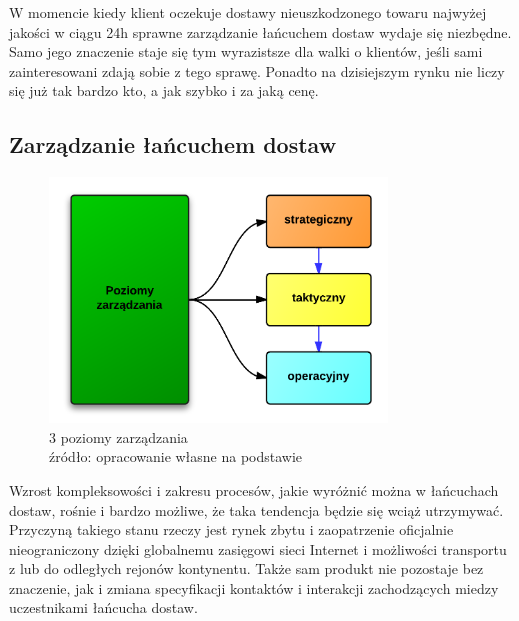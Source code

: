 		W momencie kiedy klient oczekuje dostawy nieuszkodzonego 
		towaru najwyżej jakości w ciągu 24h sprawne zarządzanie 
		łańcuchem dostaw wydaje się niezbędne. Samo jego znaczenie staje
		się tym wyrazistsze dla walki o klientów, jeśli sami zainteresowani
		zdają sobie z tego sprawę. Ponadto na dzisiejszym rynku nie liczy się
		już tak bardzo kto, a jak szybko i za jaką cenę.
		
	\subsection{Zarządzanie łańcuchem dostaw}
		\begin{figure}[h]
			\centering
			\includegraphics[width=0.8\textwidth]{images/3LevelsScm}
			\caption[3 poziomy zarządzania łańcuchem dostaw]{
				3 poziomy zarządzania\\
				źródło: opracowanie własne na podstawie \cite{ewolucja_lancuchow_dostaw_cz1}
			}
			\label{fig:3_levels_of_supply_chain}
		\end{figure}
		
		Wzrost kompleksowości i zakresu procesów, jakie wyróżnić można
		w łańcuchach dostaw, rośnie i bardzo możliwe, że taka tendencja będzie
		się wciąż utrzymywać. Przyczyną takiego stanu rzeczy jest rynek zbytu
		i zaopatrzenie oficjalnie nieograniczony dzięki globalnemu zasięgowi
		sieci Internet i możliwości transportu z lub do odległych rejonów kontynentu.
		Także sam produkt nie pozostaje bez znaczenie, jak i zmiana specyfikacji kontaktów
		i interakcji zachodzących miedzy uczestnikami łańcucha dostaw.
		
